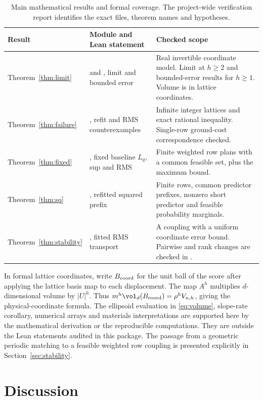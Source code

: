 \documentclass[11pt,a4paper]{article}
\theoremstyle{definition}
\begin{document}
\begin{table}[htbp]
\small\centering
\caption{Main mathematical results and formal coverage. The project-wide verification report identifies the exact files, theorem names and hypotheses.}\label{tab:lean}
\begin{tabularx}{\linewidth}{p{.23\linewidth}YY}
\toprule
Result & Module and Lean statement & Checked scope\\
\midrule
Theorem~\ref{thm:limit} &  and , limit and bounded error & Real invertible coordinate model. Limit at \(h\ge2\) and bounded-error results for \(h\ge1\). Volume is in lattice coordinates.\\
Theorem~\ref{thm:failure} & , refit and RMS counterexamples & Infinite integer lattices and exact rational inequality. Single-row ground-cost correspondence checked.\\
Theorem~\ref{thm:fixed} & , fixed baseline \(L_q\), sup and RMS & Finite weighted row plans with a common feasible set, plus the maximum bound.\\
Theorem~\ref{thm:sq} & , refitted squared prefix & Finite rows, common predictor prefixes, nonzero short predictor and feasible probability marginals.\\
Theorem~\ref{thm:stability} & , fitted RMS transport & A coupling with a uniform coordinate error bound. Pairwise and rank changes are checked in .\\
\bottomrule
\end{tabularx}
\end{table}

In formal lattice coordinates, write \(B_{\rm coord}\) for the unit ball of the score after applying the lattice basis map to each displacement. The map \(A^h\) multiplies \(d\)-dimensional volume by \(|U|^h\). Thus \(m^h\vol_d(B_{\rm coord})=\rho^hV_{n,h}\), giving the physical-coordinate formula. The ellipsoid evaluation in \eqref{eq:volume}, slope-rate corollary, numerical arrays and materials interpretations are supported here by the mathematical derivation or the reproducible computations. They are outside the Lean statements audited in this package. The passage from a geometric periodic matching to a feasible weighted row coupling is presented explicitly in Section~\ref{sec:stability}.

\section{Discussion}\label{sec:discussion}
\end{document}
